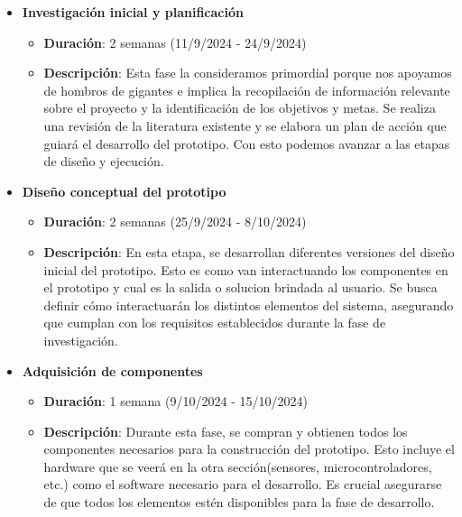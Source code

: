 \begin{itemize}
    \item \textbf{Investigación inicial y planificación}
    \begin{itemize}
        \item \textbf{Duración}: 2 semanas (11/9/2024 - 24/9/2024)
        \item \textbf{Descripción}: Esta fase la consideramos primordial porque nos apoyamos de hombros de gigantes e implica la recopilación de información relevante sobre el proyecto y la identificación de los objetivos y metas. Se realiza una revisión de la literatura existente y se elabora un plan de acción que guiará el desarrollo del prototipo. Con esto podemos avanzar a las etapas de diseño y ejecución.
    \end{itemize}
    
    \item \textbf{Diseño conceptual del prototipo}
    \begin{itemize}
        \item \textbf{Duración}: 2 semanas (25/9/2024 - 8/10/2024)
        \item \textbf{Descripción}: En esta etapa, se desarrollan diferentes versiones del diseño inicial del prototipo. Esto es como van interactuando los componentes en el prototipo y cual es la salida o solucion brindada al usuario. Se busca definir cómo interactuarán los distintos elementos del sistema, asegurando que cumplan con los requisitos establecidos durante la fase de investigación.
    \end{itemize}

    \item \textbf{Adquisición de componentes}
    \begin{itemize}
        \item \textbf{Duración}: 1 semana (9/10/2024 - 15/10/2024)
        \item \textbf{Descripción}: Durante esta fase, se compran y obtienen todos los componentes necesarios para la construcción del prototipo. Esto incluye el hardware que se veerá en la otra sección(sensores, microcontroladores, etc.) como el software necesario para el desarrollo. Es crucial asegurarse de que todos los elementos estén disponibles para la fase de desarrollo.
    \end{itemize}


\end{itemize}
